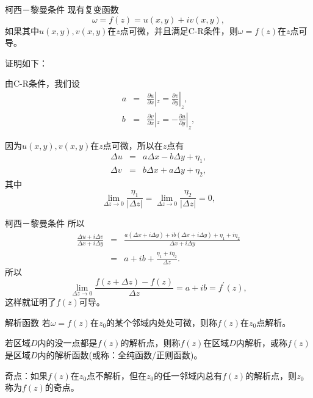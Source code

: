 \documentclass[11pt]{beamer}
\newcommand{\kong}[1][0.5]{\vspace{#1cm}}
\begin{document}
\begin{frame}{柯西－黎曼条件}
现有复变函数
\begin{equation}
\omega = f(z) = u(x,y) + iv(x,y),
\end{equation}
如果其中$u(x,y),v(x,y)$在$z$点可微，并且满足C-R条件，则$\omega = f(z)$在$z$点可导。

证明如下：

由C-R条件，我们设
\begin{eqnarray}
a &=& \frac{\partial u}{\partial x} |_z = \frac{\partial v}{\partial y} |_z, \\
b &=& \frac{\partial v}{\partial x} |_z = - \frac{\partial u}{\partial y} |_z,
\end{eqnarray}

因为$u(x,y),v(x,y)$在$z$点可微，所以在$z$点有
\begin{eqnarray}
\Delta u &=& a \Delta x - b \Delta y + \eta_1, \\
\Delta v &=& b \Delta x + a \Delta y + \eta_2,
\end{eqnarray}
其中
\begin{equation}
\lim\limits_{\Delta z \rightarrow 0} \frac{\eta_1}{|\Delta z|}
= \lim\limits_{\Delta z \rightarrow 0} \frac{\eta_2}{|\Delta z|} = 0,
\end{equation}
\end{frame}

\begin{frame}{柯西－黎曼条件}
所以
\begin{eqnarray}
\frac{\Delta u + i \Delta v}{\Delta x + i \Delta y}
&=& \frac{ a(\Delta x + i \Delta y) + ib(\Delta x + i\Delta y) + \eta_1 + i \eta_2}{\Delta x + i \Delta y} \\
&=& a + ib + \frac{ \eta_1 + i \eta_2}{ \Delta z }.
\end{eqnarray}
所以
\begin{equation}
\lim\limits_{\Delta z \rightarrow 0} \frac{ f(z+\Delta z) - f(z)}{\Delta z} = a + ib = f^\prime(z),
\end{equation}
这样就证明了$f(z)$可导。
\end{frame}

\begin{frame}{解析函数}
若$\omega = f(z)$在$z_0$的某个邻域内处处可微，则称$f(z)$在$z_0$点解析。

\kong[0.5]
若区域$D$内的没一点都是$f(z)$的解析点，则称$f(z)$在区域$D$内解析，或称$f(z)$是区域$D$内的解析函数(或称：全纯函数/正则函数)。

\kong[0.5]
奇点：如果$f(z)$在$z_0$点不解析，但在$z_0$的任一邻域内总有$f(z)$的解析点，则$z_0$称为$f(z)$的奇点。

\end{frame}
\end{document}
